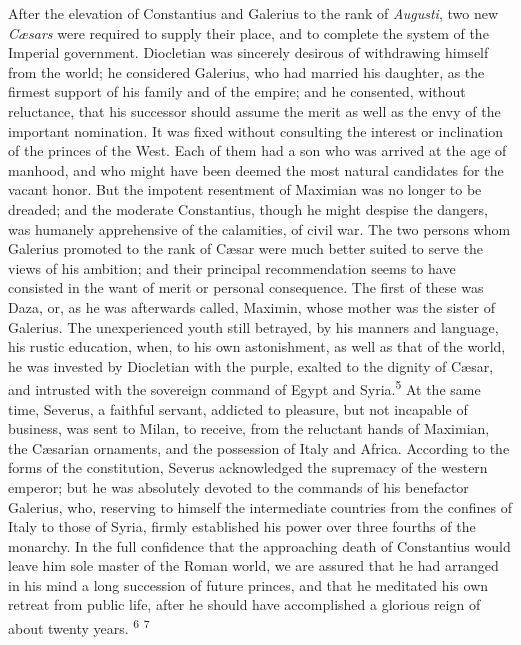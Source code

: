 After the elevation of Constantius and Galerius to the rank of
\textit{Augusti}, two new \textit{Cæsars} were required to supply their place,
and to complete the system of the Imperial government. Diocletian
was sincerely desirous of withdrawing himself from the world; he
considered Galerius, who had married his daughter, as the firmest
support of his family and of the empire; and he consented,
without reluctance, that his successor should assume the merit as
well as the envy of the important nomination. It was fixed
without consulting the interest or inclination of the princes of
the West. Each of them had a son who was arrived at the age of
manhood, and who might have been deemed the most natural
candidates for the vacant honor. But the impotent resentment of
Maximian was no longer to be dreaded; and the moderate
Constantius, though he might despise the dangers, was humanely
apprehensive of the calamities, of civil war. The two persons
whom Galerius promoted to the rank of Cæsar were much better
suited to serve the views of his ambition; and their principal
recommendation seems to have consisted in the want of merit or
personal consequence. The first of these was Daza, or, as he was
afterwards called, Maximin, whose mother was the sister of
Galerius. The unexperienced youth still betrayed, by his manners
and language, his rustic education, when, to his own
astonishment, as well as that of the world, he was invested by
Diocletian with the purple, exalted to the dignity of Cæsar, and
intrusted with the sovereign command of Egypt and Syria.\textsuperscript{5} At the
same time, Severus, a faithful servant, addicted to pleasure, but
not incapable of business, was sent to Milan, to receive, from
the reluctant hands of Maximian, the Cæsarian ornaments, and the
possession of Italy and Africa. According to the forms of the
constitution, Severus acknowledged the supremacy of the western
emperor; but he was absolutely devoted to the commands of his
benefactor Galerius, who, reserving to himself the intermediate
countries from the confines of Italy to those of Syria, firmly
established his power over three fourths of the monarchy. In the
full confidence that the approaching death of Constantius would
leave him sole master of the Roman world, we are assured that he
had arranged in his mind a long succession of future princes, and
that he meditated his own retreat from public life, after he
should have accomplished a glorious reign of about twenty years. \textsuperscript{6} \textsuperscript{7}


